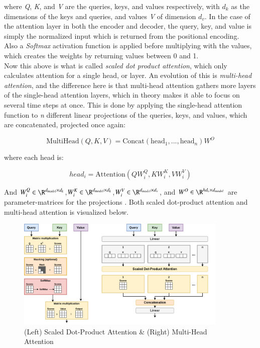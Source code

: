 \documentclass[main.tex]{subfiles}
\begin{document}
where \textit{Q}, \textit{K}, and \textit{V} are the queries, keys, and values respectively, with $d_k$ as the dimensions of the keys and queries, and values \textit{V} of dimension $d_v$. In the case of the attention layer in both the encoder and decoder, the query, key, and value is simply the normalized input which is returned from the positional encoding.\\
Also a \textit{Softmax} activation function is applied before multiplying with the values, which creates the weights by returning values between 0 and 1.\\
Now this above is what is called \textit{scaled dot product attention}, which only calculates attention for a single head, or layer. An evolution of this is \textit{multi-head attention}, and the difference here is that multi-head attention gathers more layers of the single-head attention layers, which in theory makes it able to focus on several time steps at once. This is done by applying the single-head attention function to \textit{n} different linear projections of the queries, keys, and values, which are concatenated, projected once again:

$$\text{MultiHead}(Q,K,V) = \text{Concat}(\text{head}_1,...,\text{head}_n)W^O$$

where each head is:

$$head_i = \text{Attention}(QW_i^Q,KW_i^K,VW_i^V)$$

And $W_i^Q \in \R^{d_{model}\times d_k}$,$W_i^K \in \R^{d_{model}\times d_k}$,$W_i^V \in \R^{d_{model} \times d_v}$, and $W^O \in \R^{hd_v \times d_{model}}$ are parameter-matrices for the projections \cite{Attention}. Both scaled dot-product attention and multi-head attention is visualized below.

\begin{figure}[H]
    \centering
    \includegraphics[width=0.9\textwidth]{Figures/Attention.png}
    \caption{(Left) Scaled Dot-Product Attention & (Right) Multi-Head Attention}
    \label{fig:Attention_figure}
\end{figure}
\end{document}

